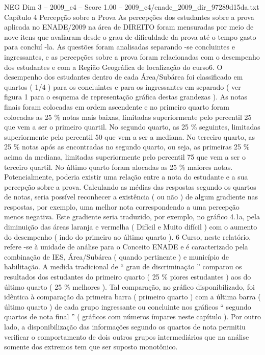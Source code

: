 \begin{textsample}{NEG Dim 3 – 2009\_c4 – Score 1.00 – 2009\_c4/enade\_2009\_dir\_97289d15da.txt}  \label{ex:f3_neg_157}
Capítulo 4 Percepção sobre a Prova As percepções dos estudantes sobre a prova aplicada no ENADE/2009 na área de DIREITO foram mensuradas por meio de nove itens que avaliaram desde o grau de dificuldade da prova até o tempo gasto para concluí -la.
As questões foram analisadas separando -se concluintes e ingressantes, e as percepções sobre a prova foram relacionadas com o desempenho dos estudantes e com a Região Geográfica de localização do curso6.
O desempenho dos estudantes dentro de cada Área/Subárea foi classificado em quartos ( 1/4 ) para os concluintes e para os ingressantes em separado ( ver figura 1 para o esquema de representação gráfica destas grandezas ).
As notas finais foram colocadas em ordem ascendente e no primeiro quarto foram colocadas as 25 \% notas mais baixas, limitadas superiormente pelo percentil 25 que vem a ser o primeiro quartil.
No segundo quarto, as 25 \% seguintes, limitadas superiormente pelo percentil 50 que vem a ser a mediana.
No terceiro quarto, as 25 \% notas após as encontradas no segundo quarto, ou seja, as primeiras 25 \% acima da mediana, limitadas superiormente pelo percentil 75 que vem a ser o terceiro quartil.
No último quarto foram alocadas as 25 \% maiores notas.
Potencialmente, poderia existir uma relação entre a nota do estudante e a sua percepção sobre a prova.
Calculando as médias das respostas segundo os quartos de notas, seria possível reconhecer a existência ( ou não ) de algum gradiente nas respostas, por exemplo, uma melhor nota correspondendo a uma percepção menos negativa.
Este gradiente seria traduzido, por exemplo, no gráfico 4.1a, pela diminuição das áreas laranja e vermelha ( Difícil e Muito difícil ) com o aumento do desempenho ( indo do primeiro ao último quarto ). 6 Curso, neste relatório, refere -se à unidade de análise para o Conceito ENADE e é caracterizado pela combinação de IES, Área/Subárea ( quando pertinente ) e município de habilitação.
A medida tradicional de “ grau de discriminação ” comparou os resultados dos estudantes do primeiro quarto ( 25 \% piores estudantes ) aos do último quarto ( 25 \% melhores ).
Tal comparação, no gráfico disponibilizado, foi idêntica à comparação da primeira barra ( primeiro quarto ) com a última barra ( último quarto ) de cada grupo ingressante ou concluinte nos gráficos “ segundo quartos de nota final ” ( gráficos com números ímpares neste capítulo ).
Por outro lado, a disponibilização das informações segundo os quartos de nota permitiu verificar o comportamento de dois outros grupos intermediários que na análise somente dos extremos tem que ser suposto monotônico.

\end{textsample}
